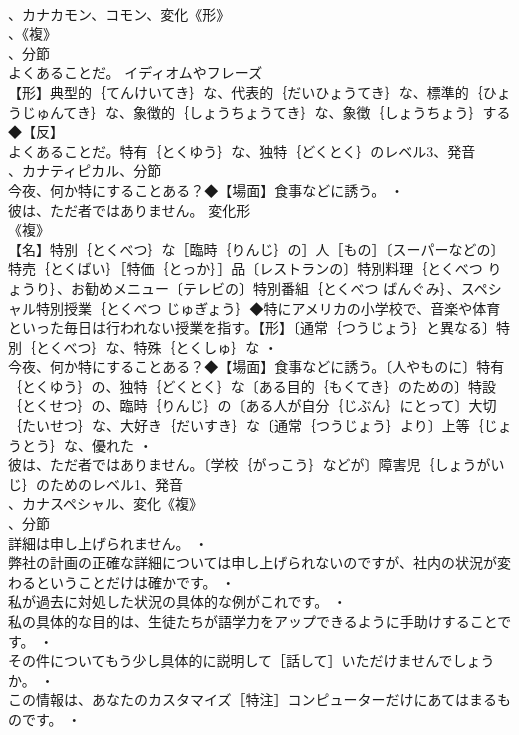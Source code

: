 \documentclass[8pt]{extreport}
\begin{document}
\begin{CJK}{UTF8}{min}
\\	、カナカモン、コモン、変化《形》
\\	、《複》
\\	、分節
\\	よくあることだ。	イディオムやフレーズ 
\\	【形】典型的｛てんけいてき｝な、代表的｛だいひょうてき｝な、標準的｛ひょうじゅんてき｝な、象徴的｛しょうちょうてき｝な、象徴｛しょうちょう｝する◆【反】
\\	よくあることだ。特有｛とくゆう｝な、独特｛どくとく｝のレベル3、発音
\\	、カナティピカル、分節
\\	今夜、何か特にすることある？◆【場面】食事などに誘う。 ・
\\	彼は、ただ者ではありません。	変化形 
\\	《複》
\\	【名】特別｛とくべつ｝な［臨時｛りんじ｝の］人［もの］〔スーパーなどの〕特売｛とくばい｝［特価｛とっか｝］品〔レストランの〕特別料理｛とくべつ りょうり｝、お勧めメニュー〔テレビの〕特別番組｛とくべつ ばんぐみ｝、スペシャル特別授業｛とくべつ じゅぎょう｝◆特にアメリカの小学校で、音楽や体育といった毎日は行われない授業を指す。【形】〔通常｛つうじょう｝と異なる〕特別｛とくべつ｝な、特殊｛とくしゅ｝な ・
\\	今夜、何か特にすることある？◆【場面】食事などに誘う。〔人やものに〕特有｛とくゆう｝の、独特｛どくとく｝な〔ある目的｛もくてき｝のための〕特設｛とくせつ｝の、臨時｛りんじ｝の〔ある人が自分｛じぶん｝にとって〕大切｛たいせつ｝な、大好き｛だいすき｝な〔通常｛つうじょう｝より〕上等｛じょうとう｝な、優れた ・
\\	彼は、ただ者ではありません。〔学校｛がっこう｝などが〕障害児｛しょうがいじ｝のためのレベル1、発音
\\	、カナスペシャル、変化《複》
\\	、分節
\\	詳細は申し上げられません。 ・
\\	弊社の計画の正確な詳細については申し上げられないのですが、社内の状況が変わるということだけは確かです。 ・
\\	私が過去に対処した状況の具体的な例がこれです。 ・
\\	私の具体的な目的は、生徒たちが語学力をアップできるように手助けすることです。 ・
\\	その件についてもう少し具体的に説明して［話して］いただけませんでしょうか。 ・
\\	この情報は、あなたのカスタマイズ［特注］コンピューターだけにあてはまるものです。 ・

\end{CJK}
\end{document}
